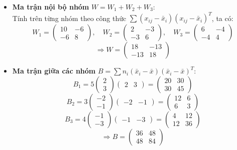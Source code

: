 \documentclass[12pt, a4paper]{article}
\begin{document}
\begin{itemize}
    \item \textbf{Ma trận nội bộ nhóm} $W = W_1 + W_2 + W_3$:
    \\
    Tính trên từng nhóm theo công thức $\sum (x_{ij} - \bar{x}_i)(x_{ij} - \bar{x}_i)^T$, ta có:
    \[ W_1 = \begin{pmatrix} 10 & -6 \\ -6 & 8 \end{pmatrix}, \quad W_2 = \begin{pmatrix} 2 & -3 \\ -3 & 6 \end{pmatrix}, \quad W_3 = \begin{pmatrix} 6 & -4 \\ -4 & 4 \end{pmatrix} \]
    \[ \Rightarrow W = \begin{pmatrix} 18 & -13 \\ -13 & 18 \end{pmatrix} \]

    \item \textbf{Ma trận giữa các nhóm} $B = \sum n_i (\bar{x}_i - \bar{x})(\bar{x}_i - \bar{x})^T$:
    \[ B_1 = 5 \begin{pmatrix} 2 \\ 3 \end{pmatrix} \begin{pmatrix} 2 & 3 \end{pmatrix} = \begin{pmatrix} 20 & 30 \\ 30 & 45 \end{pmatrix} \]
    \[ B_2 = 3 \begin{pmatrix} -2 \\ -1 \end{pmatrix} \begin{pmatrix} -2 & -1 \end{pmatrix} = \begin{pmatrix} 12 & 6 \\ 6 & 3 \end{pmatrix} \]
    \[ B_3 = 4 \begin{pmatrix} -1 \\ -3 \end{pmatrix} \begin{pmatrix} -1 & -3 \end{pmatrix} = \begin{pmatrix} 4 & 12 \\ 12 & 36 \end{pmatrix} \]
    \[ \Rightarrow B = \begin{pmatrix} 36 & 48 \\ 48 & 84 \end{pmatrix} \]
\end{itemize}
\end{document}
